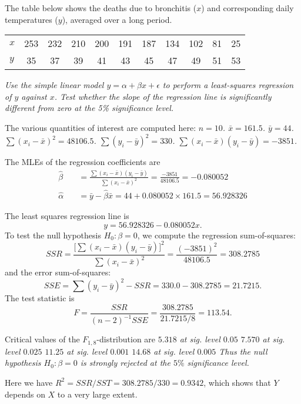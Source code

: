 \begin{example}
The table below shows the deaths due to bronchitis ($x$) and corresponding daily temperatures ($y$), averaged over a long period.
\begin{center}
\begin{tabular}{lcccccccccc}\hline
$x$ & 253 & 232 & 210 & 200 & 191 & 187 & 134 & 102 & 81 & 25 \\
$y$ & 35 & 37 & 39 & 41 & 43 & 45 & 47 & 49 & 51 & 53 \\ \hline
\end{tabular}
\end{center}
\ben
\it Use the simple linear model $y = \alpha + \beta x + \epsilon$ to perform a least-squares regression of $y$ against $x$. 
\it Test whether the slope of the regression line is significantly different from zero at the 5\% significance level.
\een
\begin{solution}
The various quantities of interest are computed here:
\bit
\it $n = 10$.
\it $\bar{x} = 161.5$.
\it $\bar{y} = 44$.
\it $\sum (x_i-\bar{x})^2	= 48106.5$.
\it $\sum (y_i-\bar{y})^2 = 330$.
\it $\sum (x_i-\bar{x})(y_i-\bar{y}) = -3851$.
\eit

The MLEs of the regression coefficients are
\begin{align*}
\hat{\beta}		&\quad = \frac{\sum (x_i-\bar{x})(y_i-\bar{y})}{\sum (x_i-\bar{x})^2} = \frac{-3851}{48106.5} = -0.080052 \\
\hat{\alpha}	&\quad = \bar{y}-\hat{\beta}\bar{x} = 44 + 0.080052{\times}161.5 = 56.928326
\end{align*}

The least squares regression line is 
\[
y = 56.928326 - 0.080052x.
\]
To test the null hypothesis $H_0:\beta=0$, we compute the regression sum-of-squares:
\[
SSR = \frac{\big[\sum (x_i-\bar{x})(y_i-\bar{y})\big]^{2}}{\sum (x_i-\bar{x})^2} 
	=\frac{(-3851)^{2}}{48106.5} 
	= 308.2785
\]
and the error sum-of-squares:
\[
SSE	= \sum (y_i-\bar{y})^2 - SSR = 330.0 - 308.2785 =  21.7215.
\]
The test statistic is
\[
F = \frac{SSR}{(n-2)^{-1}SSE} = \frac{308.2785}{21.7215/8} = 113.54.
\]

Critical values of the $F_{1,8}$-distribution are
\bit
\it $5.318$ at sig. level $0.05$
\it $7.570$ at sig. level $0.025$
\it $11.25$ at sig. level $0.001$
\it $14.68$ at sig. level $0.005$
\eit
Thus the null hypothesis $H_0:\beta = 0$ is strongly rejected at the $5\%$ significance level.

\bigskip
Here we have $R^2 = SSR/SST = 308.2785/330 = 0.9342$, which shows that $Y$ depends on $X$ to a very large extent.
\end{solution}
\end{example}


